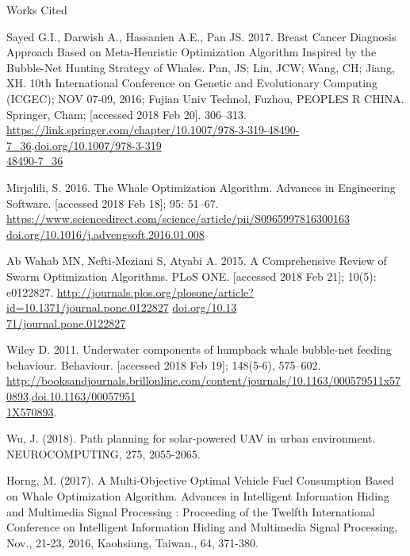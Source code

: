 \documentclass[11pt]{article}
\newcommand{\bibent}{\noindent \hangindent 40pt}
\newenvironment{workscited}{\newpage \begin{center} Works Cited \end{center}}{\newpage }
\begin{document}
\begin{workscited}

    \bibent
    Sayed G.I., Darwish A., Hassanien A.E., Pan JS. 2017. Breast Cancer Diagnosis Approach Based on Meta-Heuristic Optimization Algorithm Inspired by the Bubble-Net Hunting Strategy of Whales. Pan, JS; Lin, JCW; Wang, CH; Jiang, XH. 10th International Conference on Genetic and Evolutionary Computing (ICGEC); NOV 07-09, 2016; Fujian Univ Technol, Fuzhou, PEOPLES R CHINA. Springer, Cham; [accessed 2018 Feb 20]. 306--313. \url{https://link.springer.com/chapter/10.1007/978-3-319-48490-7_36}.\url{doi.org/10.1007/978-3-319}\\\url{48490-7_36}

    \bibent
    Mirjalili, S. 2016. The Whale Optimization Algorithm. Advances in Engineering Software. [accessed 2018 Feb 18]; 95: 51--67. \url{https://www.sciencedirect.com/science/article/pii/S0965997816300163} \url{doi.org/10.1016/j.advengsoft.2016.01.008}

    \bibent
    Ab Wahab MN, Nefti-Meziani S, Atyabi A. 2015. A Comprehensive Review of Swarm Optimization Algorithms. PLoS ONE. [accessed 2018 Feb 21]; 10(5): e0122827. \url{http://journals.plos.org/plosone/article?id=10.1371/journal.pone.0122827} \url{doi.org/10.13}\\\url{71/journal.pone.0122827}

    \bibent
    Wiley D. 2011. Underwater components of humpback whale bubble-net feeding behaviour. Behaviour. [accessed 2018 Feb 19]; 148(5-6), 575--602. \url{http://booksandjournals.brillonline.com/content/journals/10.1163/000579511x570893}.\url{doi.10.1163/00057951}\\\url{1X570893}.


    \bibent
    Wu, J. (2018). Path planning for solar-powered UAV in urban environment. NEUROCOMPUTING, 275, 2055-2065.

    \bibent
    Horng, M. (2017). A Multi-Objective Optimal Vehicle Fuel Consumption Based on Whale Optimization Algorithm. Advances in Intelligent Information Hiding and Multimedia Signal Processing : Proceeding of the Twelfth International Conference on Intelligent Information Hiding and Multimedia Signal Processing, Nov., 21-23, 2016, Kaohsiung, Taiwan., 64, 371-380.

\end{workscited}
\end{document}
